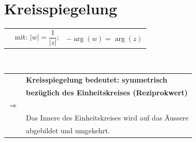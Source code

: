 \section{Kreisspiegelung}
	\begin{minipage}[]{0.5\textwidth}
		\begin{tabular}{lll}
			\fbox{$w = \overline{f}\left( z \right) = \dfrac{1}{\overline{z}}$} &
			mit: $|w| = \dfrac{1}{\left| z \right|}$; &
			$-\operatorname{arg}\left( w \right) = \operatorname{arg}\left( z \right)$\\[3pt]
		\end{tabular}\\[3pt]
		\begin{tabular}{ll}
			 & \textbf{Kreisspiegelung bedeutet: symmetrisch}\\[3pt]
			 & \textbf{bezüglich des Einheitskreises (Reziprokwert)}\\[0.5mm]
			$\Rightarrow$ & \\[0.5mm]
			 & Das Innere des Einheitskreises wird auf das Äussere\\[3pt]
			 & abgebildet und umgekehrt.\\[3pt]
		\end{tabular}
	\end{minipage}
	\begin{minipage}[]{0.5\textwidth}
		\scalebox{0.5}{}
	\end{minipage}\\[3pt]

